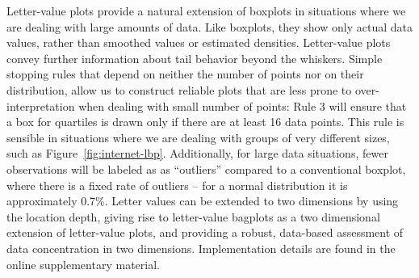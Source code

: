 \documentclass[12pt,oneside]{article}
\begin{document}
Letter-value plots provide a natural extension of boxplots in situations where we are dealing with large amounts of data. Like boxplots, they show only actual data values, rather than smoothed values or estimated densities. Letter-value plots convey further information about tail behavior beyond the whiskers. Simple stopping rules that depend on neither the number of points nor on their distribution, allow us to construct reliable plots that are less prone to over-interpretation when dealing with small number of points: Rule 3 will ensure that a box for quartiles is drawn only if there are at least 16 data points. This rule is sensible in situations where we are dealing with groups of very different sizes, such as Figure~\ref{fig:internet-lbp}. Additionally, for large data situations, fewer observations will be labeled as as ``outliers'' compared to a conventional boxplot, where there is a fixed rate of outliers -- for a normal distribution it is approximately 0.7\%. Letter values can be extended to two dimensions by using the location depth, giving rise to letter-value bagplots as a two dimensional extension of letter-value plots, and providing a robust, data-based assessment of data concentration in two dimensions. Implementation details are found in the online supplementary material.



%
\end{document}
